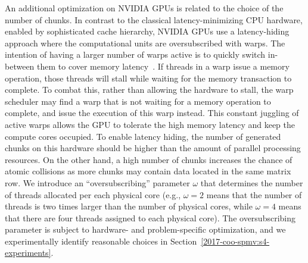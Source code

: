 An additional optimization on NVIDIA GPUs is related to the choice of the
number of chunks.
In contrast to the classical latency-minimizing CPU hardware, enabled by
sophisticated cache hierarchy, NVIDIA GPUs use a latency-hiding approach
where the 
computational units are oversubscribed with warps.
The intention of having a larger number of warps active
is to quickly switch in-between them to cover memory latency~\cite{lawn2016}. 
If threads in a warp issue a memory operation, those threads will stall while waiting for the
memory transaction to complete. To combat this, rather than
allowing the hardware to stall, the warp scheduler may find a
warp that is not waiting for a memory operation to complete,
and issue the execution of this warp instead. This constant juggling
of active warps allows the GPU to tolerate the high memory
latency and keep the compute cores occupied.
To enable latency hiding, the number of generated chunks on this hardware
should be higher than the amount of parallel processing resources.
On the other hand, a high number of chunks increases the chance of atomic
collisions as more chunks may contain data located in the same matrix row.
We introduce an ``oversubscribing'' parameter $\omega$ that
determines the number of threads 
allocated per each physical core
(e.g., $\omega = 2$ means that the number of threads is two times larger 
than the number of physical cores, while $\omega = 4$ 
means that there are four threads assigned to each physical core).
The oversubscribing parameter is subject to hardware- and problem-specific optimization,
and we experimentally identify reasonable choices in Section~\ref{2017-coo-spmv:s4-experiments}.

